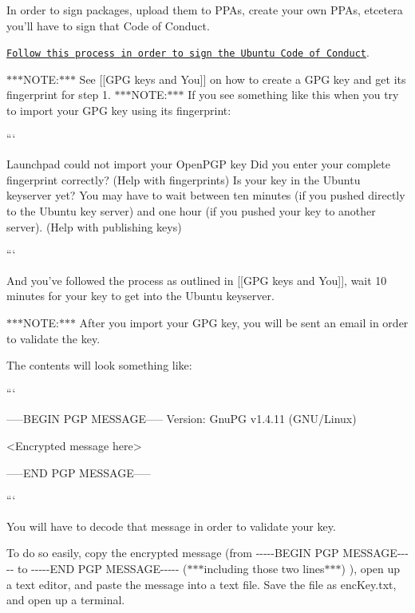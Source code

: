 In order to sign packages, upload them to P\-P\-As, create your own P\-P\-As, etcetera you'll have to sign that Code of Conduct.

\href{https://launchpad.net/codeofconduct}{\tt Follow this process in order to sign the Ubuntu Code of Conduct}.

$\ast$$\ast$$\ast$\-N\-O\-T\-E\-:$\ast$$\ast$$\ast$ See \mbox{[}\mbox{[}G\-P\-G keys and You\mbox{]}\mbox{]} on how to create a G\-P\-G key and get its fingerprint for step 1. $\ast$$\ast$$\ast$\-N\-O\-T\-E\-:$\ast$$\ast$$\ast$ If you see something like this when you try to import your G\-P\-G key using its fingerprint\-:

```

Launchpad could not import your Open\-P\-G\-P key Did you enter your complete fingerprint correctly? (Help with fingerprints) Is your key in the Ubuntu keyserver yet? You may have to wait between ten minutes (if you pushed directly to the Ubuntu key server) and one hour (if you pushed your key to another server). (Help with publishing keys)

```

And you've followed the process as outlined in \mbox{[}\mbox{[}G\-P\-G keys and You\mbox{]}\mbox{]}, wait 10 minutes for your key to get into the Ubuntu keyserver.

$\ast$$\ast$$\ast$\-N\-O\-T\-E\-:$\ast$$\ast$$\ast$ After you import your G\-P\-G key, you will be sent an email in order to validate the key.

The contents will look something like\-:

``` \begin{DoxyVerb}-----BEGIN PGP MESSAGE-----
Version: GnuPG v1.4.11 (GNU/Linux)

<Encrypted message here>

-----END PGP MESSAGE-----
\end{DoxyVerb}


```

You will have to decode that message in order to validate your key.

To do so easily, copy the encrypted message (from {\ttfamily -\/-\/-\/-\/-\/\-B\-E\-G\-I\-N P\-G\-P M\-E\-S\-S\-A\-G\-E-\/-\/-\/-\/-\/} to {\ttfamily -\/-\/-\/-\/-\/\-E\-N\-D P\-G\-P M\-E\-S\-S\-A\-G\-E-\/-\/-\/-\/-\/} ($\ast$$\ast$$\ast$including those two lines$\ast$$\ast$$\ast$) ), open up a text editor, and paste the message into a text file. Save the file as {\ttfamily enc\-Key.\-txt}, and open up a terminal.

